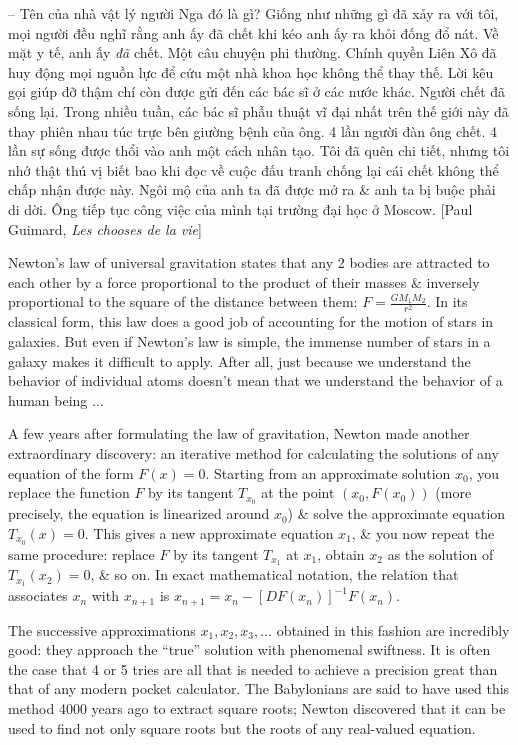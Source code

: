 \documentclass{article}
\begin{document}
\begin{enumerate}
	-- Tên của nhà vật lý người Nga đó là gì? Giống như những gì đã xảy ra với tôi, mọi người đều nghĩ rằng anh ấy đã chết khi kéo anh ấy ra khỏi đống đổ nát. Về mặt y tế, anh ấy {\it đã} chết. Một câu chuyện phi thường. Chính quyền Liên Xô đã huy động mọi nguồn lực để cứu một nhà khoa học không thể thay thế. Lời kêu gọi giúp đỡ thậm chí còn được gửi đến các bác sĩ ở các nước khác. Người chết đã sống lại. Trong nhiều tuần, các bác sĩ phẫu thuật vĩ đại nhất trên thế giới này đã thay phiên nhau túc trực bên giường bệnh của ông. 4 lần người đàn ông chết. 4 lần sự sống được thổi vào anh một cách nhân tạo. Tôi đã quên chi tiết, nhưng tôi nhớ thật thú vị biết bao khi đọc về cuộc đấu tranh chống lại cái chết không thể chấp nhận được này. Ngôi mộ của anh ta đã được mở ra \& anh ta bị buộc phải di dời. Ông tiếp tục công việc của mình tại trường đại học ở Moscow. [{\sc Paul Guimard}, {\it Les chooses de la vie}]
	
	{\sc Newton}'s law of universal gravitation states that any 2 bodies are attracted to each other by a force proportional to the product of their masses \& inversely proportional to the square of the distance between them: $F = \frac{GM_1M_2}{r^2}$. In its classical form, this law does a good job of accounting for the motion of stars in galaxies. But even if {\sc Newton}'s law is simple, the immense number of stars in a galaxy makes it difficult to apply. After all, just because we understand the behavior of individual atoms doesn't mean that we understand the behavior of a human being $\ldots$
	
	A few years after formulating the law of gravitation, {\sc Newton} made another extraordinary discovery: an iterative method for calculating the solutions of any equation of the form $F(x) = 0$. Starting from an approximate solution $x_0$, you replace the function $F$ by its tangent $T_{x_0}$ at the point $(x_0,F(x_0))$ (more precisely, the equation is linearized around $x_0$) \& solve the approximate equation $T_{x_0}(x) = 0$. This gives a new approximate equation $x_1$, \& you now repeat the same procedure: replace $F$ by its tangent $T_{x_1}$ at $x_1$, obtain $x_2$ as the solution of $T_{x_1}(x_2) = 0$, \& so on. In exact mathematical notation, the relation that associates $x_n$ with $x_{n+1}$ is $x_{n+1} = x_n - [DF(x_n)]^{-1}F(x_n)$.
	
	The successive approximations $x_1,x_2,x_3,\ldots$ obtained in this fashion are incredibly good: they approach the ``true'' solution with phenomenal swiftness. It is often the case that 4 or 5 tries are all that is needed to achieve a precision great than that of any modern pocket calculator. The Babylonians are said to have used this method 4000 years ago to extract square roots; {\sc Newton} discovered that it can be used to find not only square roots but the roots of any real-valued equation.
	

\end{enumerate}
\end{document}

